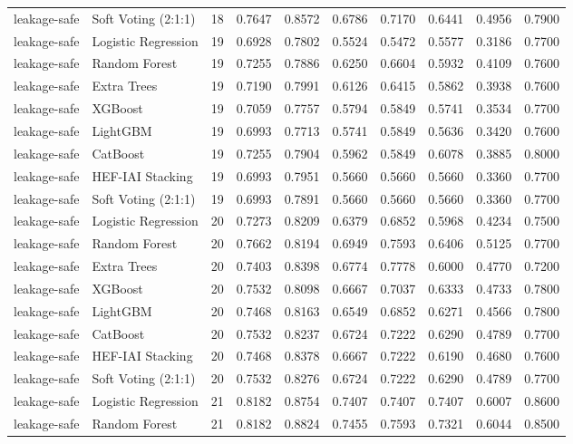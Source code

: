 \begin{tabular}{llrrrrrrrr}
leakage-safe & Soft Voting (2:1:1) & 18 & 0.7647 & 0.8572 & 0.6786 & 0.7170 & 0.6441 & 0.4956 & 0.7900 \\
leakage-safe & Logistic Regression & 19 & 0.6928 & 0.7802 & 0.5524 & 0.5472 & 0.5577 & 0.3186 & 0.7700 \\
leakage-safe & Random Forest & 19 & 0.7255 & 0.7886 & 0.6250 & 0.6604 & 0.5932 & 0.4109 & 0.7600 \\
leakage-safe & Extra Trees & 19 & 0.7190 & 0.7991 & 0.6126 & 0.6415 & 0.5862 & 0.3938 & 0.7600 \\
leakage-safe & XGBoost & 19 & 0.7059 & 0.7757 & 0.5794 & 0.5849 & 0.5741 & 0.3534 & 0.7700 \\
leakage-safe & LightGBM & 19 & 0.6993 & 0.7713 & 0.5741 & 0.5849 & 0.5636 & 0.3420 & 0.7600 \\
leakage-safe & CatBoost & 19 & 0.7255 & 0.7904 & 0.5962 & 0.5849 & 0.6078 & 0.3885 & 0.8000 \\
leakage-safe & HEF-IAI Stacking & 19 & 0.6993 & 0.7951 & 0.5660 & 0.5660 & 0.5660 & 0.3360 & 0.7700 \\
leakage-safe & Soft Voting (2:1:1) & 19 & 0.6993 & 0.7891 & 0.5660 & 0.5660 & 0.5660 & 0.3360 & 0.7700 \\
leakage-safe & Logistic Regression & 20 & 0.7273 & 0.8209 & 0.6379 & 0.6852 & 0.5968 & 0.4234 & 0.7500 \\
leakage-safe & Random Forest & 20 & 0.7662 & 0.8194 & 0.6949 & 0.7593 & 0.6406 & 0.5125 & 0.7700 \\
leakage-safe & Extra Trees & 20 & 0.7403 & 0.8398 & 0.6774 & 0.7778 & 0.6000 & 0.4770 & 0.7200 \\
leakage-safe & XGBoost & 20 & 0.7532 & 0.8098 & 0.6667 & 0.7037 & 0.6333 & 0.4733 & 0.7800 \\
leakage-safe & LightGBM & 20 & 0.7468 & 0.8163 & 0.6549 & 0.6852 & 0.6271 & 0.4566 & 0.7800 \\
leakage-safe & CatBoost & 20 & 0.7532 & 0.8237 & 0.6724 & 0.7222 & 0.6290 & 0.4789 & 0.7700 \\
leakage-safe & HEF-IAI Stacking & 20 & 0.7468 & 0.8378 & 0.6667 & 0.7222 & 0.6190 & 0.4680 & 0.7600 \\
leakage-safe & Soft Voting (2:1:1) & 20 & 0.7532 & 0.8276 & 0.6724 & 0.7222 & 0.6290 & 0.4789 & 0.7700 \\
leakage-safe & Logistic Regression & 21 & 0.8182 & 0.8754 & 0.7407 & 0.7407 & 0.7407 & 0.6007 & 0.8600 \\
leakage-safe & Random Forest & 21 & 0.8182 & 0.8824 & 0.7455 & 0.7593 & 0.7321 & 0.6044 & 0.8500 \\

\end{tabular}
